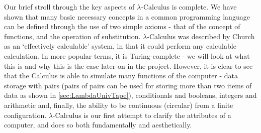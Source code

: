 \documentclass[Master.tex]{subfiles}
\begin{document}
Our brief stroll through the key aspects of $\lambda$-Calculus is complete. We have shown that many basic necessary concepts in a common programming language can be defined through the use of two simple axioms - that of the concept of functions, and the operation of substitution. $\lambda$-Calculus was described by Church as an `effectively calculable' system, in that it could perform any calculable calculation. In more popular terms, it is Turing-complete - we will look at what this is and why this is the case later on in the project. However, it is clear to see that the Calculus is able to simulate many functions of the computer - data storage with pairs (pairs of pairs can be used for storing more than two items of data as shown in \cref{sec:LambdaUnivTape}), conditionals and booleans, integers and arithmetic and, finally, the ability to be continuous (circular) from a finite configuration. $\lambda$-Calculus is our first attempt to clarify the attributes of a computer, and does so both fundamentally and aesthetically.
\end{document}
